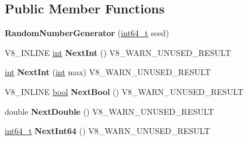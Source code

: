 \subsection*{Public Member Functions}
\begin{DoxyCompactItemize}
\item 
\mbox{\label{classv8_1_1base_1_1RandomNumberGenerator_adb6de9543dad50afa7986a2e35ce003f}} 
{\bfseries Random\+Number\+Generator} (\mbox{\hyperlink{classint64__t}{int64\+\_\+t}} seed)
\item 
\mbox{\label{classv8_1_1base_1_1RandomNumberGenerator_aef22ff5ed9ab075348bb7988874ad6f8}} 
V8\+\_\+\+I\+N\+L\+I\+NE \mbox{\hyperlink{classint}{int}} {\bfseries Next\+Int} () V8\+\_\+\+W\+A\+R\+N\+\_\+\+U\+N\+U\+S\+E\+D\+\_\+\+R\+E\+S\+U\+LT
\item 
\mbox{\label{classv8_1_1base_1_1RandomNumberGenerator_a32102edf0e72631705af5a3316fd4068}} 
\mbox{\hyperlink{classint}{int}} {\bfseries Next\+Int} (\mbox{\hyperlink{classint}{int}} max) V8\+\_\+\+W\+A\+R\+N\+\_\+\+U\+N\+U\+S\+E\+D\+\_\+\+R\+E\+S\+U\+LT
\item 
\mbox{\label{classv8_1_1base_1_1RandomNumberGenerator_a9f4f789dc1abf53926db911f1db7534d}} 
V8\+\_\+\+I\+N\+L\+I\+NE \mbox{\hyperlink{classbool}{bool}} {\bfseries Next\+Bool} () V8\+\_\+\+W\+A\+R\+N\+\_\+\+U\+N\+U\+S\+E\+D\+\_\+\+R\+E\+S\+U\+LT
\item 
\mbox{\label{classv8_1_1base_1_1RandomNumberGenerator_a3cb661fd70f4322d36792f98acd6ca7e}} 
double {\bfseries Next\+Double} () V8\+\_\+\+W\+A\+R\+N\+\_\+\+U\+N\+U\+S\+E\+D\+\_\+\+R\+E\+S\+U\+LT
\item 
\mbox{\label{classv8_1_1base_1_1RandomNumberGenerator_ac44e22b8b6250f2cc8666c880a4871a8}} 
\mbox{\hyperlink{classint64__t}{int64\+\_\+t}} {\bfseries Next\+Int64} () V8\+\_\+\+W\+A\+R\+N\+\_\+\+U\+N\+U\+S\+E\+D\+\_\+\+R\+E\+S\+U\+LT
\item 
\mbox{\label{classv8_1_1base_1_1RandomNumberGenerator_a0094583611a7499452662dcdcc2b6ddb}} 

\end{DoxyCompactItemize}
